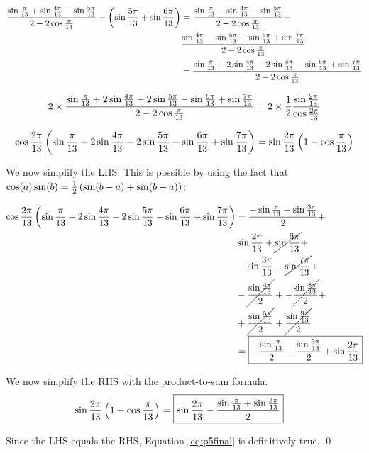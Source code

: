 \documentclass[10pt]{../usamts}
\begin{document}
\begin{solution}
\begin{align*}
    \frac{\sin{{\frac{\pi}{13}}} + \sin{{\frac{4\pi}{13}}} - \sin{{\frac{5\pi}{13}}}} {2 - 2\cos{{\frac{\pi}{13}}}}
    -\left( \sin{{\frac{5\pi}{13}}} + \sin{{\frac{6\pi}{13}}} \right)
    &= \frac{\sin{{\frac{\pi}{13}}} + \sin{{\frac{4\pi}{13}}} - \sin{{\frac{5\pi}{13}}}} {2 - 2\cos{{\frac{\pi}{13}}}} +\\
    & \frac{\sin{{\frac{4\pi}{13}}} - \sin{{\frac{5\pi}{13}}} -\sin{{\frac{6\pi}{13}}} + \sin{{\frac{7\pi}{13}}}} {2 - 2\cos{{\frac{\pi}{13}}}} \\
    &= \frac{\sin{{\frac{\pi}{13}}} + 2\sin{{\frac{4\pi}{13}}} - 2\sin{{\frac{5\pi}{13}}} - \sin{{\frac{6\pi}{13}}} + \sin{{\frac{7\pi}{13}}}} {2 - 2\cos{{\frac{\pi}{13}}}} \\
\end{align*}

\begin{equation*}
    2 \times \frac{\sin{{\frac{\pi}{13}}} + 2\sin{{\frac{4\pi}{13}}} - 2\sin{{\frac{5\pi}{13}}} - \sin{{\frac{6\pi}{13}}} + \sin{{\frac{7\pi}{13}}}} {2 - 2\cos{{\frac{\pi}{13}}}}
    = 2 \times \frac{1}{2} \frac{\sin{{\frac{2\pi}{13}}}}{\cos{{\frac{2\pi}{13}}}} \\
\end{equation*}

\begin{equation}
    \cos{{\frac{2\pi}{13}}}\left( \sin{{\frac{\pi}{13}}} + 2\sin{{\frac{4\pi}{13}}} - 2\sin{{\frac{5\pi}{13}}} - \sin{{\frac{6\pi}{13}}} + \sin{{\frac{7\pi}{13}}} \right)
    = \sin{{\frac{2\pi}{13}}}\left( 1 - \cos{{\frac{\pi}{13}}} \right)
    \label{eq:p5final}
\end{equation}

We now simplify the LHS. This is possible by using the fact that $\cos(a)\sin(b) = \frac{1}{2}\left( \sin(b-a) + \sin(b+a) \right)$:

\begin{align*}
    \cos{{\frac{2\pi}{13}}}\left( \sin{{\frac{\pi}{13}}} + 2\sin{{\frac{4\pi}{13}}} - 2\sin{{\frac{5\pi}{13}}} - \sin{{\frac{6\pi}{13}}} + \sin{{\frac{7\pi}{13}}} \right)
    &= \frac{-\sin{{\frac{\pi}{13}}} + \sin{{\frac{3\pi}{13}}}}{2} + \\
    &\sin{{\frac{2\pi}{13}}} + \cancel{\sin{{\frac{6\pi}{13}}}} + \\
    &- \sin{{\frac{3\pi}{13}}} -\cancel{\sin{{\frac{7\pi}{13}}}} + \\
    &-\cancel{\frac{\sin{{\frac{4\pi}{13}}}}{2}} + -\cancel{\frac{\sin{{\frac{8\pi}{13}}}}{2}} +\\
    &+ \cancel{\frac{\sin{{\frac{5\pi}{13}}}}{2}} + \cancel{\frac{\sin{{\frac{9\pi}{13}}}}{2}} \\
    &= \boxed{-\frac{\sin{{\frac{\pi}{13}}}}{2} - \frac{\sin{{\frac{3\pi}{13}}}}{2} + \sin{{\frac{2\pi}{13}}}}
\end{align*}

We now simplify the RHS with the product-to-sum formula.
\begin{align*}
    \sin{{\frac{2\pi}{13}}}\left( 1 - \cos{{\frac{\pi}{13}}} \right)
    &= \boxed{\sin{{\frac{2\pi}{13}}} - \frac{\sin{{\frac{\pi}{13}}} + \sin{{\frac{3\pi}{13}}}}{2}}
\end{align*}

Since the LHS equals the RHS, Equation \ref{eq:p5final} is definitively true.
\qed
\end{solution}
\end{document}
